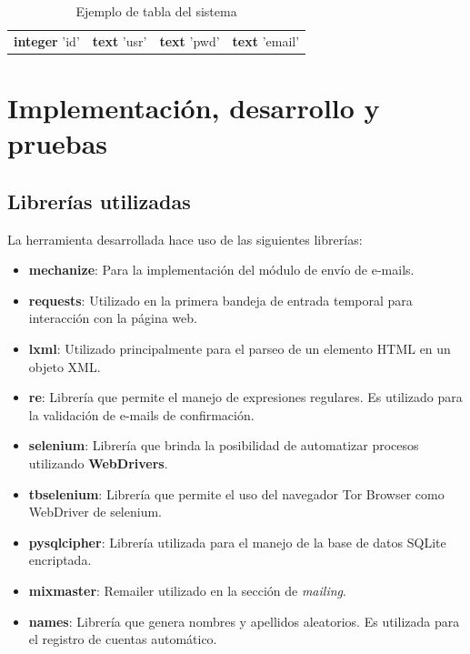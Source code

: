 \begin{table}[H]
	\centering
	\label{my-label}
	\begin{tabular}{|c|c|c|c|}
		\hline
		\rowcolor[HTML]{BBDAFF} 
		\multicolumn{4}{|c|}{\cellcolor[HTML]{BBDAFF}'facebook'} \\ \hline
		\rowcolor[HTML]{ECF4FF} 
		\textbf{integer} 'id'    & \textbf{text} 'usr'   & \textbf{text} 'pwd'   & \textbf{text} 'email'   \\ \hline
	\end{tabular}
	\caption{Ejemplo de tabla del sistema}
\end{table}

\section{Implementación, desarrollo y pruebas}
\subsection{Librerías utilizadas}

La herramienta desarrollada hace uso de las siguientes librerías:

\begin{itemize}
	\item \textbf{mechanize}: Para la implementación del módulo de envío de e-mails.
	\item \textbf{requests}: Utilizado en la primera bandeja de entrada temporal para interacción con la página web.
	\item \textbf{lxml}: Utilizado principalmente para el parseo de un elemento HTML en un objeto XML.
	\item \textbf{re}: Librería que permite el manejo de expresiones regulares. Es utilizado para la validación de e-mails de confirmación.
	\item \textbf{selenium}: Librería que brinda la posibilidad de automatizar procesos utilizando \textbf{WebDrivers}.
	\item \textbf{tbselenium}: Librería que permite el uso del navegador Tor Browser como WebDriver de selenium.	
	\item \textbf{pysqlcipher}: Librería utilizada para el manejo de la base de datos SQLite encriptada.	
	\item \textbf{mixmaster}: Remailer utilizado en la sección de \textit{mailing}.
	\item \textbf{names}: Librería que genera nombres y apellidos aleatorios.	Es utilizada para el registro de cuentas automático.
\end{itemize}

